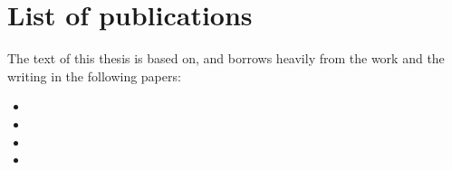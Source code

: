 \section{List of publications}
\label{overview:publications}

The text of this thesis is based on, and borrows heavily from the work and the
writing in the following papers:

\begin{itemize}
\item {}
\item {}
\item {}
\item {}
\end{itemize}
